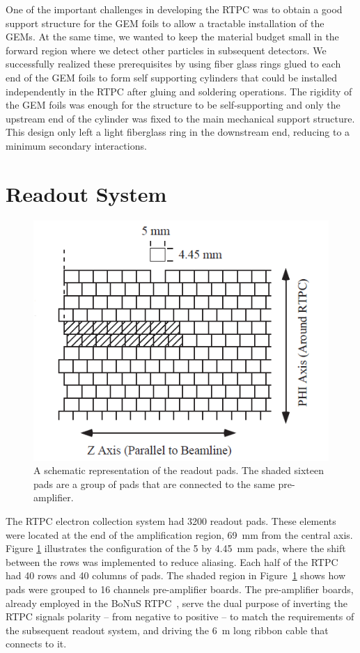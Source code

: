 \documentclass[preprint,5p]{elsarticle}
\begin{document}
One of the important challenges in developing the RTPC was to obtain a good 
support structure for the GEM foils to allow a tractable installation of the 
GEMs. At the same time, we wanted to keep the material budget small in the 
forward region where we detect other particles in subsequent detectors. We 
successfully realized these prerequisites by using fiber glass rings glued to 
each end of the GEM foils to form self supporting cylinders that could be 
installed independently in the RTPC after gluing and soldering operations. The 
rigidity of the GEM foils was enough
for the structure to be self-supporting and only the upstream end of the cylinder 
was fixed to the main mechanical support structure. This design only left a 
light fiberglass ring in the downstream end, reducing to a minimum secondary 
interactions.

\section{Readout System} \label{sec_readout}

\begin{figure}[tb]
   \centering
   \includegraphics[scale=0.55]{PADs.png}
   \caption[]{A schematic representation of the readout pads. The 
   shaded sixteen pads are a group of pads that are connected to the same 
pre-amplifier.} \label{fig:PADs}
\end{figure}

The RTPC electron collection system had 3200 readout pads. These elements were
located at the end of the amplification region, 69~mm from the central axis.
Figure \ref{fig:PADs} illustrates the configuration of the 5 by 4.45~mm pads,
where the shift between the rows was implemented to reduce aliasing. Each half 
of the RTPC had 40 rows and 40 columns of pads. The shaded region in 
Figure~\ref{fig:PADs} shows how pads were grouped to 16 channels pre-amplifier 
boards. The pre-amplifier boards, already employed in the BoNuS 
RTPC~\cite{Fenker:2008zz}, serve the dual purpose of inverting the RTPC signals 
polarity -- from negative to positive -- to match the requirements of the 
subsequent readout system, and driving the 6~m long ribbon cable that connects 
to it.
\end{document}
